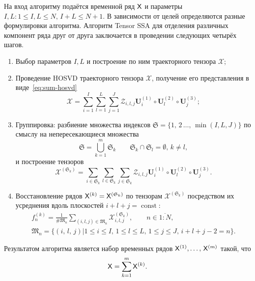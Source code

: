 \documentclass[specialist,
    substylefile = spbu_report.rtx,
    subf,href,colorlinks=true, 12pt]{disser}
\theoremstyle{plain}
\theoremstyle{definition}
\theoremstyle{remark}
\begin{document}
    На вход алгоритму подаётся временной ряд $\mathsf{X}$ и параметры $I,L: 1\leqslant I,L \leqslant N,\, I + L \leqslant N + 1$.
    В зависимости от целей определяются разные формулировки алгоритма.
    Алгоритм Tensor SSA для отделения различных компонент ряда друг от друга заключается в проведении следующих четырёх шагов.
    \begin{enumerate}
        \item Выбор параметров $I, L$ и построение по ним траекторного тензора $\mathcal{X}$;
        \item Проведение HOSVD траекторного тензора $\mathcal{X}$, получение его представления в виде~\eqref{eq:sum-hosvd}
        \begin{equation}
            \mathcal{X}=\sum_{i=1}^{I} \sum_{l=1}^{L} \sum_{j=1}^{J} \mathcal{Z}_{i,l,j} \mathbf{U}^{(1)}_{i}
            \circ \mathbf{U}^{(2)}_{l} \circ \mathbf{U}^{(3)}_{j};
            \label{eq:trajectory-hosvd}
        \end{equation}
        \item Группировка: разбиение множества индексов $\mathfrak{S}=\{1,\, 2\,\ldots,\, \min(I, L, J)\}$ по смыслу на
        непересекающиеся множества
        \[
            \mathfrak{S}=\bigcup_{k=1}^{m}\mathfrak{S}_k \qquad \mathfrak{S}_k\cap \mathfrak{S}_l =\emptyset,\, k\ne l,
        \]
        и построение тензоров
        \begin{equation*}
            \mathcal{X}^{(\mathfrak{S}_k)}=\sum_{i \in \mathfrak{S}_k} \sum_{l\in \mathfrak{S}_k} \sum_{j\in \mathfrak{S}_k}
            \mathcal{Z}_{i,l,j} \mathbf{U}^{(1)}_{i}\circ \mathbf{U}^{(2)}_{l} \circ \mathbf{U}^{(3)}_{j}.
        \end{equation*}
        \item Восстановление рядов $\mathsf{X}^{(k)}=\mathsf{X}^{(\mathfrak{S}_k)}$ по тензорам $\mathcal{X}^{(\mathfrak{S}_k)}$ посредством их усреднения вдоль
        плоскостей $i+l+j=\operatorname{const}$:
        \begin{gather*}
            f^{(k)}_n=\frac{1}{\#\mathfrak{M}_n}\sum_{(i,l,j)\in \mathfrak{M}_n} \mathcal{X}^{(\mathfrak{S}_k)}_{i,l,j},\qquad n\in \overline{1:N},\\
            \mathfrak{M}_n=\{(i,\, l,\, j) | 1\leqslant i \leqslant I,\, 1\leqslant l \leqslant L,\, 1\leqslant j \leqslant J,\, i+l+j-2=n\}.
        \end{gather*}
    \end{enumerate}
    Результатом алгоритма является набор временных рядов $\mathsf{X}^{(1)},\ldots,\, \mathsf{X}^{(m)}$ такой, что
    \[
        \mathsf{X}=\sum_{k=1}^{m}\mathsf{X}^{(k)}.
    \]
\end{document}
